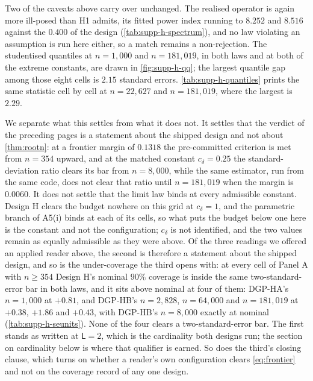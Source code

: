 \documentclass[
  12pt]{article}
\newcommand{\1}[1]{\mathds{1}\left[#1\right]}
\theoremstyle{plain}
\theoremstyle{definition}
\theoremstyle{definition}
\theoremstyle{remark}
\begin{document}
Two of the caveats above carry over unchanged. The realised operator is again
more ill-posed than H1 admits, its fitted power index running to $8.252$ and
$8.516$ against the $0.400$ of the design (\cref{tab:supp-h-spectrum}), and no
law violating an assumption is run here either, so a match remains a
non-rejection. The studentised quantiles at $n=1{,}000$ and $n=181{,}019$, in
both laws and at both of the extreme constants, are drawn in \cref{fig:supp-h-qq}; the largest quantile gap among those eight cells is $2.15$ standard
errors. \cref{tab:supp-h-quantiles} prints the same statistic cell by cell at $n=22{,}627$ and
$n=181{,}019$, where the largest is $2.29$.

We separate what this settles from what it does not. It settles that the verdict
of the preceding pages is a statement about the shipped design and not about
\cref{thm:rootn}: at a frontier margin of $0.1318$ the pre-committed criterion is
met from $n=354$ upward, and at the matched constant $c_\delta=0.25$
the standard-deviation ratio clears its bar from $n=8{,}000$, while the same
estimator, run from the same code, does not clear that ratio until $n=181{,}019$
when the margin is $0.0060$. It does not settle that the limit law binds at every
admissible constant. Design H clears the budget nowhere on this grid at
$c_\delta=1$, and the parametric branch of A5(i) binds at each of its cells, so
what puts the budget below one here is the constant and not the configuration;
$c_\delta$ is not identified, and the two values remain as
equally admissible as they were above. Of the three readings we offered an
applied reader above, the second is therefore a statement about the shipped
design, and so is the under-coverage the third opens with: at every cell of
Panel A with $n\ge354$ Design H's nominal $90\%$ coverage is inside the same
two-standard-error bar in both laws, and it sits above nominal at four of them:
DGP-HA's $n=1{,}000$ at $+0.81$, and DGP-HB's $n=2{,}828$, $n=64{,}000$ and
$n=181{,}019$ at $+0.38$, $+1.86$ and $+0.43$, with DGP-HB's $n=8{,}000$ exactly
at nominal (\cref{tab:supp-h-seunits}). None of the four clears a
two-standard-error bar. The
first stands as written at $\mathsf L=2$, which is the cardinality both designs
run; the section on cardinality below is where that qualifier is earned. So does the third's
closing clause, which turns on whether a reader's own configuration clears
\eqref{eq:frontier} and not on the coverage record of any one design.
\end{document}
